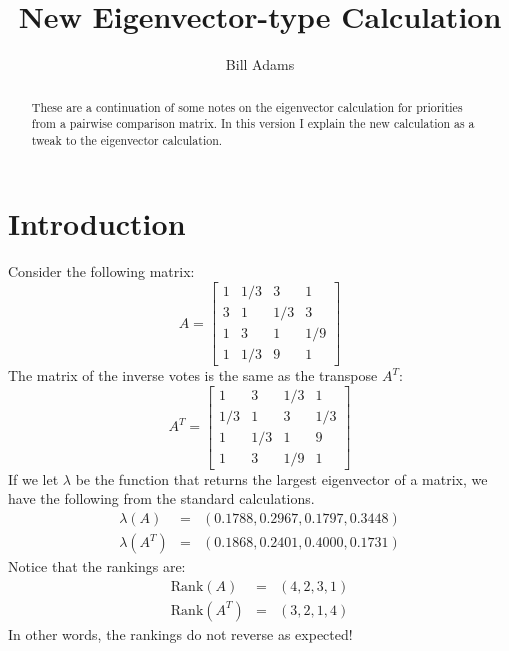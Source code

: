\documentclass[12pt]{article}
\title{New Eigenvector-type Calculation}
\author{Bill Adams}
\begin{document}
\maketitle
\begin{abstract}
These are a continuation of some notes on the eigenvector calculation
for priorities from a pairwise comparison matrix.  In this version
I explain the new calculation as a tweak to the eigenvector calculation.
\end{abstract}

\section{Introduction}
Consider the following matrix:
$$A =\begin{bmatrix}
1   & 1/3 &  3  & 1   \\
3   & 1   & 1/3 & 3   \\
1   & 3   & 1   & 1/9 \\
1   & 1/3 & 9   & 1
\end{bmatrix}
$$
The matrix of the inverse votes is the same as the transpose $A^T$:
$$A^T =\begin{bmatrix}
1   & 3   & 1/3 & 1   \\
1/3 & 1   & 3   & 1/3 \\
1   & 1/3 & 1   & 9   \\
1   & 3   & 1/9 & 1
\end{bmatrix}
$$
If we let $\lambda$ be the function that returns the largest
eigenvector of a matrix, we have the following from the standard
calculations.
\begin{eqnarray*}
	\lambda(A)&=&(0.1788,0.2967, 0.1797, 0.3448) \\
	\lambda(A^T)&=&(0.1868, 0.2401, 0.4000, 0.1731)
\end{eqnarray*}
Notice that the rankings are:
\begin{eqnarray*}
	\mathrm{Rank}(A)&=&(4, 2, 3, 1) \\
	\mathrm{Rank}(A^T)&=&(3, 2, 1, 4)
\end{eqnarray*}
In other words, the rankings do not reverse as expected!
\end{document}
